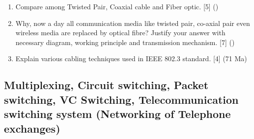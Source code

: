 \documentclass[12pt]{article}
\begin{document}
\begin{enumerate}[noitemsep, topsep=0pt]
			\item Compare among Twisted Pair, Coaxial cable and Fiber optic. \hfill [5] ()
			
			\item Why, now a day all communication media like twisted pair, co-axial pair even wireless media are replaced by optical fibre? Justify your answer with necessary diagram, working principle and transmission mechanism. \hfill [7] ()
			
			\item Explain various cabling techniques used in IEEE 802.3 standard. \hfill [4] (71 Ma)
		\end{enumerate}

	\subsection{Multiplexing, Circuit switching, Packet switching, VC Switching, Telecommunication switching system (Networking of Telephone exchanges)}
\end{document}
